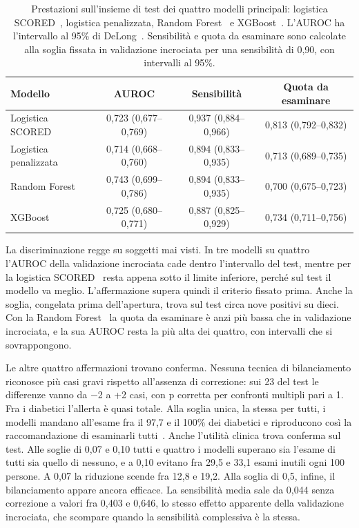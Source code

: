 \documentclass[a4paper, 12pt, oneside]{book}
\begin{document}
\begin{table}[H]
	\centering
	\small
	\caption{Prestazioni sull'insieme di test dei quattro modelli principali: logistica SCORED~\cite{bang_screening_2007}, logistica penalizzata, Random Forest~\cite{breiman_random_2001} e XGBoost~\cite{chen_xgboost_2016}. L'AUROC ha l'intervallo al 95\% di DeLong~\cite{delong_comparing_1988}. Sensibilità e quota da esaminare sono calcolate alla soglia fissata in validazione incrociata per una sensibilità di 0,90, con intervalli al 95\%.}
	\label{tab:test}
	\begin{tabular}{@{}lccc@{}}
		\toprule
		Modello & AUROC & Sensibilità & Quota da esaminare \\
		\midrule
		Logistica SCORED & 0,723 (0,677--0,769) & 0,937 (0,884--0,966) & 0,813 (0,792--0,832) \\
		Logistica penalizzata & 0,714 (0,668--0,760) & 0,894 (0,833--0,935) & 0,713 (0,689--0,735) \\
		Random Forest & 0,743 (0,699--0,786) & 0,894 (0,833--0,935) & 0,700 (0,675--0,723) \\
		XGBoost & 0,725 (0,680--0,771) & 0,887 (0,825--0,929) & 0,734 (0,711--0,756) \\
		\bottomrule
	\end{tabular}
\end{table}

La discriminazione regge su soggetti mai visti. In tre modelli su quattro l'AUROC della validazione incrociata cade dentro l'intervallo del test, mentre per la logistica SCORED~\cite{bang_screening_2007} resta appena sotto il limite inferiore, perché sul test il modello va meglio. L'affermazione supera quindi il criterio fissato prima.  Anche la soglia, congelata prima dell'apertura, trova sul test circa nove positivi su dieci. Con la Random Forest~\cite{breiman_random_2001} la quota da esaminare è anzi più bassa che in validazione incrociata, e la sua AUROC resta la più alta dei quattro, con intervalli che si sovrappongono.

Le altre quattro affermazioni trovano conferma. Nessuna tecnica di bilanciamento riconosce più casi gravi rispetto all'assenza di correzione: sui 23 del test le differenze vanno da $-$2 a +2 casi, con p corretta per confronti multipli pari a 1. Fra i diabetici l'allerta è quasi totale. Alla soglia unica, la stessa per tutti, i modelli mandano all'esame fra il 97,7 e il 100\% dei diabetici e riproducono così la raccomandazione di esaminarli tutti~\cite{american_diabetes_association_professional_practice_committee_11_2024}. Anche l'utilità clinica trova conferma sul test. Alle soglie di 0,07 e 0,10 tutti e quattro i modelli superano sia l'esame di tutti sia quello di nessuno, e a 0,10 evitano fra 29,5 e 33,1 esami inutili ogni 100 persone. A 0,07 la riduzione scende fra 12,8 e 19,2. Alla soglia di 0,5, infine, il bilanciamento appare ancora efficace. La sensibilità media sale da 0,044 senza correzione a valori fra 0,403 e 0,646, lo stesso effetto apparente della validazione incrociata, che scompare quando la sensibilità complessiva è la stessa.
\end{document}

